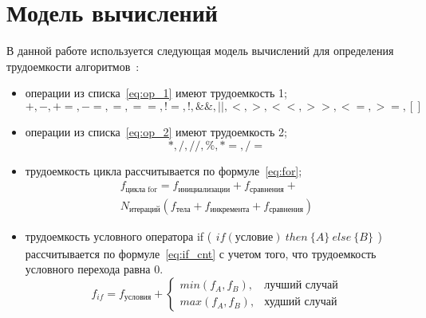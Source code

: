 \documentclass[12pt]{report}
\begin{document}
    \section{Модель вычислений}
    В данной работе используется следующая модель вычислений для определения трудоемкости алгоритмов~\cite{ulanov}:
    \begin{itemize}
        \item операции из списка~\ref{eq:op_1} имеют трудоемкость 1;
        \begin{equation}
            \label{eq:op_1}
            +, -, +=, -=, =, ==, !=, !, \&\&, ||, <, >, <<, >>, <=, >=, [ ]
        \end{equation}
        \item операции из списка~\ref{eq:op_2} имеют трудоемкость 2;
        \begin{equation}
            \label{eq:op_2}
            *, /, //, \%, *=, /=
        \end{equation}
        \item трудоемкость цикла рассчитывается по формуле~\ref{eq:for};
        \begin{equation}
            \label{eq:for}
            \begin{array}{ll}
                f_{\text{цикла for}} = f_{\text{инициализации}} + f_{\text{сравнения}} + \\
                N_{\text{итераций}} (f_{\text{тела}} + f_{\text{инкремента}} + f_{\text{сравнения}})
            \end{array}
        \end{equation}
        \item трудоемкость условного оператора if ($
        \begin{array}{ll}
            if (\text{условие}) \ then \ \{A\}\ else \	 \{B\}
        \end{array}
        $) рассчитывается по формуле~\ref{eq:if_cnt} с учетом того, что трудоемкость условного перехода равна 0. \\
        \begin{equation}
            \label{eq:if_cnt}
            f_{if} = f_{\text{условия}} +
            \begin{cases}
                min(f_A, f_B), & \textrm{лучший случай}\\
                max(f_A, f_B), & \textrm{худший случай}
            \end{cases}
        \end{equation}
    \end{itemize}
\end{document}
